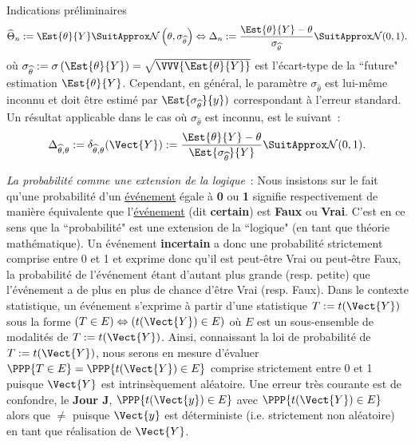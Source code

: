 \documentclass[10pt]{report}
\begin{document}
\begin{IndicList}{Indications préliminaires}
\[
 \widehat{\Theta}_n:=\Est{\theta}{Y}\SuitApprox \mathcal{N}\left(\theta,\sigma_{\widehat{\theta}}\right) \Leftrightarrow \Delta_n:=\frac{\Est{\theta}{Y} -\theta }{\sigma_{\widehat{\theta}} } \SuitApprox \mathcal{N}(0,1).
\]
où $\sigma_{\widehat{\theta}}:=\sigma\left(\Est{\theta}{Y}\right)=\sqrt{\VVV{\Est{\theta}{Y}}}$ est l'écart-type de la ``future" estimation  $\Est{\theta}{Y}$. Cependant, en général, le paramètre $\sigma_{\widehat{\theta}}$ est lui-même inconnu et doit être estimé par $\Est{\sigma_{\widehat{\theta}}}{y})$ correspondant à  l'erreur standard. Un résultat applicable dans le cas où $\sigma_{\widehat{\theta}}$ est inconnu, est le suivant~:
\[
  \Delta_{\widehat{\theta},\theta}:=\delta_{\widehat{\theta},\theta}(\Vect{Y}):=\frac{\Est{\theta}{Y} -\theta }{\Est{\sigma_{\widehat{\theta}}}{Y} } \SuitApprox \mathcal{N}(0,1).
\]

\item \textit{La probabilité comme une extension de la logique}~: Nous insistons sur le fait qu'une probabilité d'un \underline{événement} égale à \textbf{0} ou \textbf{1} signifie respectivement de manière équivalente que l'\underline{événement} (dit \textbf{certain}) est \textbf{Faux} ou \textbf{Vrai}.
C'est en ce sens que la ``probabilité" est une extension de la ``logique" (en tant que théorie mathématique). Un événement \textbf{incertain} a donc une probabilité strictement comprise entre 0 et 1 et exprime donc qu'il est peut-être Vrai ou peut-être Faux, la probabilité de l'événement étant d'autant plus grande (resp. petite) que l'événement a de plus en plus de chance d'être Vrai (resp. Faux). Dans le contexte statistique, un événement s'exprime à partir d'une statistique $T:=t(\Vect{Y})$ sous la forme  $\left(T\in E\right)\Leftrightarrow\left(t(\Vect{Y})\in E\right)$ où $E$ est un sous-ensemble de modalités de $T:=t(\Vect{Y})$. Ainsi, connaissant la loi de probabilité de $T:=t(\Vect{Y})$, nous serons en mesure d'évaluer $\PPP{T\in E}=\PPP{t(\Vect{Y})\in E}$ comprise strictement entre 0 et 1 puisque $\Vect{Y}$ est intrinsèquement aléatoire. Une erreur très courante est de confondre, le \textbf{Jour J}, $\PPP{t(\Vect{y})\in E}$ avec $\PPP{t(\Vect{Y})\in E}$ alors que  $\neq$\fbox{$\PPP{t(\Vect{Y})\in E}\in]0,1[$} puisque $\Vect{y}$ est déterministe (i.e. strictement non aléatoire) en tant que réalisation de $\Vect{Y}$.
\end{IndicList}
\end{document}
